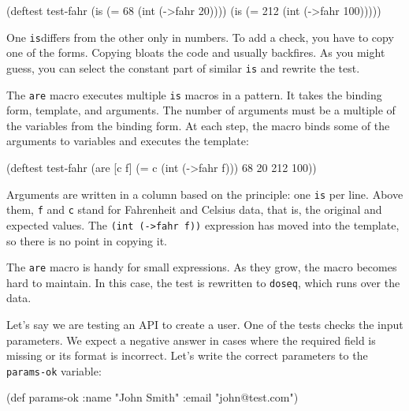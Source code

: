 \begin{english}
  \begin{clojure}
(deftest test-fahr
  (is (= 68 (int (->fahr 20))))
  (is (= 212 (int (->fahr 100)))))
  \end{clojure}
\end{english}

One \verb|is|differs from the other only in numbers. To add a check, you have to copy one of the forms. Copying bloats the code and usually backfires. As you might guess, you can select the constant part of similar \verb|is| and rewrite the test.


The \verb|are| macro executes multiple \verb|is| macros in a pattern. It takes the binding form, template, and arguments. The number of arguments must be a multiple of the variables from the binding form. At each step, the macro binds some of the arguments to variables and executes the template:

\begin{english}
  \begin{clojure}
(deftest test-fahr
  (are [c f] (= c (int (->fahr f)))
    68 20
    212 100))
  \end{clojure}
\end{english}

Arguments are written in a column based on the principle: one \verb|is| per line. Above them, \verb|f| and \verb|c| stand for Fahrenheit and Celsius data, that is, the original and expected values. The \verb|(int (->fahr f))| expression has moved into the template, so there is no point in copying it.

The \verb|are| macro is handy for small expressions. As they grow, the macro becomes hard to maintain. In this case, the test is rewritten to \verb|doseq|, which runs over the data.

Let's say we are testing an API to create a user. One of the tests checks the input parameters. We expect a negative answer in cases where the required field is missing or its format is incorrect. Let's write the correct parameters to the \verb|params-ok| variable:

\ifx\DEVICETYPE\MOBILE

\begin{english}
  \begin{clojure}
(def params-ok {:name "John Smith"
                :email "john@test.com"})
  \end{clojure}
\end{english}

